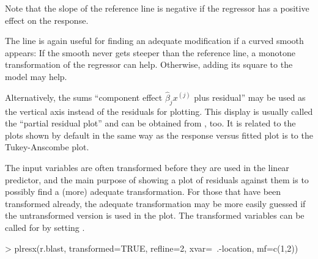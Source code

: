 \documentclass[11pt]{article}
\begin{document}

Note that the slope of the reference line is negative if the regressor has
a positive effect on the response.

The line is again useful for finding an adequate modification if a curved
smooth appears: If the smooth never gets steeper than the reference line,
a monotone transformation of the regressor can help. 
Otherwise, adding its square to the model may help.

Alternatively, the sums 
``component effect $\widehat\beta_j x^{(j)}$ plus residual''
may be used as the vertical axis instead of the
residuals for plotting. This display is usually called the 
``partial residual plot'' and can be obtained from , too. 
It is related to the plots shown by default in the same way as the
response versus fitted plot is to the Tukey-Anscombe plot.

The input variables are often transformed before they are used 
in the linear predictor,
and the main purpose of showing a plot of residuals against them is
to possibly find a (more) adequate transformation.
For those that have been transformed already, the adequate transformation 
may be more easily guessed if the untransformed version is used in the
plot. The transformed variables can be called for by setting
.

\begin{Schunk}
\begin{Sinput}
> plresx(r.blast, transformed=TRUE, refline=2, xvar=~.-location, mf=c(1,2))
\end{Sinput}
\end{Schunk}


\end{document}
